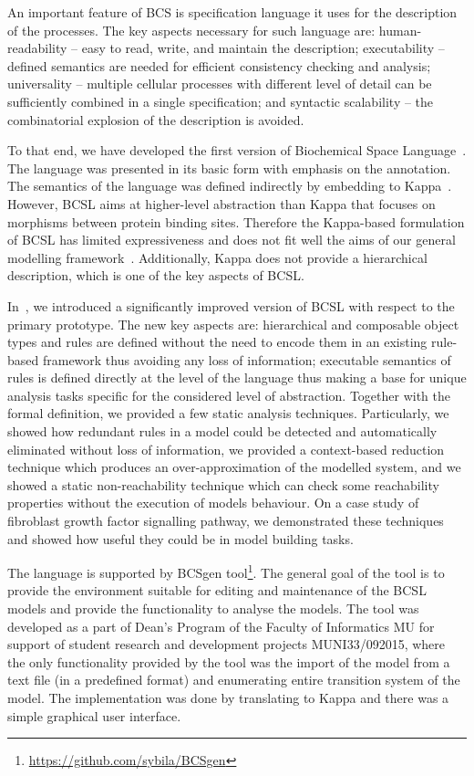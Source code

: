 \documentclass[11pt,a4paper]{report}
\begin{document}
An important feature of BCS is specification language it uses for the description of the processes. The key aspects necessary for such language are: human-readability -- easy to read, write, and maintain the description; executability -- defined semantics are needed for efficient consistency checking and analysis; universality -- multiple cellular processes with different level of detail can be sufficiently combined in a single specification; and syntactic scalability -- the combinatorial explosion of the description is avoided.

To that end, we have developed the first version of Biochemical Space Language~\cite{dved2016formal}. The language was presented in its basic form with emphasis on the annotation. The semantics of the language was defined indirectly by embedding to Kappa~\cite{kappa_formal}. However, BCSL aims at higher-level abstraction than Kappa that focuses on morphisms between protein binding sites. Therefore the Kappa-based formulation of BCSL has limited expressiveness and does not fit well the aims of our general modelling framework~\cite{klement2013comprehensive}. Additionally, Kappa does not provide a hierarchical description, which is one of the key aspects of BCSL.

In~\cite{trojak2018sasb}, we introduced a significantly improved version of BCSL with respect to the primary prototype. The new key aspects are: hierarchical and composable object types and rules are defined without the need to encode them in an existing rule-based framework thus avoiding any loss of information; executable semantics of rules is defined directly at the level of the language thus making a base for unique analysis tasks specific for the considered level of abstraction. Together with the formal definition, we provided a few static analysis techniques. Particularly, we showed how redundant rules in a model could be detected and automatically eliminated without loss of information, we provided a context-based reduction technique which produces an over-approximation of the modelled system, and we showed a static non-reachability technique which can check some reachability properties without the execution of models behaviour. On a case study of fibroblast growth factor signalling pathway, we demonstrated these techniques and showed how useful they could be in model building tasks.

The language is supported by BCSgen tool\footnote{\href{https://github.com/sybila/BCSgen}{https://github.com/sybila/BCSgen}}. The general goal of the tool is to provide the environment suitable for editing and maintenance of the BCSL models and provide the functionality to analyse the models. The tool was developed as a part of Dean's Program of the Faculty of Informatics MU for support of student research and development projects MUNI33/092015, where the only functionality provided by the tool was the import of the model from a text file (in a predefined format) and enumerating entire transition system of the model. The implementation was done by translating to Kappa and there was a simple graphical user interface.
\end{document}
